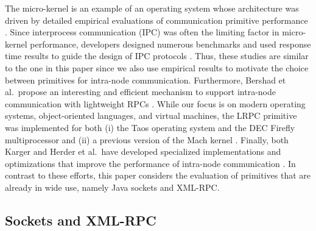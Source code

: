 \documentclass{sig-alternate}
\begin{document}
The micro-kernel is an example of an operating system whose
architecture was driven by detailed empirical evaluations of
communication primitive performance
\cite{gefflaut-sawmill,liedtke-improve-ipc,liedtke-microkernels}.
Since interprocess communication (IPC) was often the limiting factor
in micro-kernel performance, developers designed numerous benchmarks
and used response time results to guide the design of IPC protocols
\cite{hartig-micro-kernel,liedtke-improve-ipc}.  Thus, these studies
are similar to the one in this paper since we also use empirical
results to motivate the choice between primitives for intra-node
communication.  Furthermore, Bershad et al.\ propose an interesting
and efficient mechanism to support intra-node communication with
lightweight RPCs \cite{bershad-lightweight}.  While our focus is on
modern operating systems, object-oriented languages, and virtual
machines, the LRPC primitive was implemented for both (i) the Taos
operating system and the DEC Firefly multiprocessor
\cite{bershad-lightweight} and (ii) a previous version of the Mach
kernel \cite{bourassa-implementing}.  Finally, both Karger and Herder
et al.\ have developed specialized implementations and optimizations
that improve the performance of intra-node communication
\cite{tanenbaum-minix3,karger-registers}.  In contrast to these
efforts, this paper considers the evaluation of primitives that are
already in wide use, namely Java sockets and XML-RPC.

\subsection{Sockets and XML-RPC}
\label{sec:sockets-xml-rpc}


\end{document}
